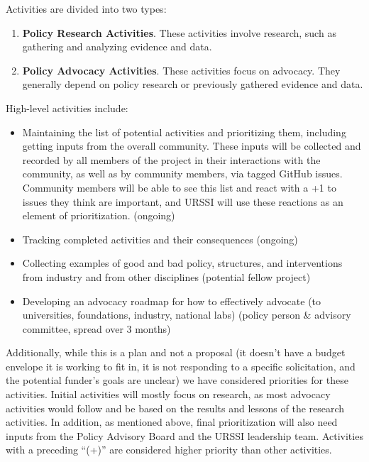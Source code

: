\documentclass[
]{book}
\begin{document}
Activities are divided into two types:

\begin{enumerate}
\def\labelenumi{\arabic{enumi}.}
\item
  \textbf{Policy Research Activities}. These activities involve research, such as gathering and analyzing evidence and data.
\item
  \textbf{Policy Advocacy Activities}. These activities focus on advocacy. They generally depend on policy research or previously
  gathered evidence and data.
\end{enumerate}

High-level activities include:

\begin{itemize}
\item
  Maintaining the list of potential activities and prioritizing them, including getting inputs
  from the overall community. These inputs will be collected and recorded by all members of the
  project in their interactions with the community, as well as by community members, via tagged
  GitHub issues. Community members will be able to see this list and react with a +1 to issues
  they think are important, and URSSI will use these reactions as an element of prioritization. (ongoing)
\item
  Tracking completed activities and their consequences (ongoing)
\item
  Collecting examples of good and bad policy, structures, and interventions from industry and
  from other disciplines (potential fellow project)
\item
  Developing an advocacy roadmap for how to effectively advocate (to universities, foundations,
  industry, national labs) (policy person \& advisory committee, spread over 3 months)
\end{itemize}

Additionally, while this is a plan and not a proposal (it doesn't have a budget envelope it is working to fit in,
it is not responding to a specific solicitation, and the potential funder's goals are unclear) we have
considered priorities for these activities. Initial activities will mostly focus on research, as most advocacy
activities would follow and be based on the results and lessons of the research activities. In addition,
as mentioned above, final prioritization will also need inputs from the Policy Advisory Board and the URSSI
leadership team. Activities with a preceding ``(+)'' are considered higher priority than other activities.
\end{document}
